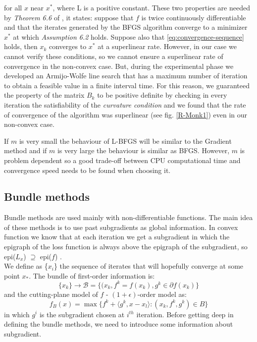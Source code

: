 for all $x$ near $x^*$, where L is a positive constant. These two properties are needed by \textit{Theorem 6.6} of \cite{numerical}, it states:  suppose that $f$ is twice continuously differentiable and that the iterates generated by the BFGS algorithm converge to a minimizer $x^*$ at which \textit{Assumption 6.2} holds. Suppose also that  \ref{eq:convergence-sequence} holds, then $x_{k}$ converges to $x^*$ at a superlinear rate. However, in our case we cannot verify these conditions, so we cannot ensure a superlinear rate of convergence in the non-convex case. But, during the experimental phase we developed an Armijo-Wolfe line search that has a maximum number of iteration to obtain a feasible value in a finite interval time. For this reason, we guaranteed the property of the matrix $B_{k}$ to be positive definite by checking in every iteration the satisfiability of the \textit{curvature condition} and we found that the rate of convergence of the algorithm was superlinear (see fig. \ref{R-Monk1}) even in our non-convex case.

If $m$ is very small the behaviour of L-BFGS will be similar to the Gradient method and if $m$ is very large the behaviour is similar as BFGS. However, $m$ is problem dependent so a good trade-off between CPU computational time and convergence speed needs to be found when choosing it.

\subsection{Bundle methods}
\label{Bundle-methods}
Bundle methods are used mainly with non-differentiable functions. The main idea of these methods is to use past subgradients as global information. In convex function we know that at each iteration we get a subgradient in which the epigraph of the loss function is always above the epigraph of the subgradient, so epi($L_x$) $ \supseteq $ epi($f$) .\\ 
We define as \{$x_i$\} the sequence of iterates that will hopefully converge at some point $x_*$. 
The bundle of first-order information is:
\begin{equation}
\{x_{k}\}\rightarrow \mathcal{B}=\{(x_{k}, f^k=f(x_{k}), g^{k} \in \partial f(x_{k})\}
\end{equation}
and the cutting-plane model of $f$ - $(1 +\epsilon)$-order model as:
\begin{equation}
\label{CP-model}
f_B(x) = \max{\{f^k+ \langle g^k,x - x_l \rangle:  (x_k,f^k,g^k)\in B\}}
\end{equation}
in which $g^i$ is the subgradient chosen at $i^{th}$ iteration.
Before getting deep in defining the bundle methods, we need to introduce some information about subgradient.
